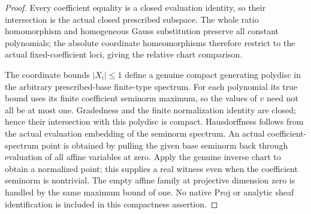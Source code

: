 \begin{proof}
Every coefficient equality is a closed evaluation identity, so their
intersection is the actual closed prescribed subspace. The whole ratio
homomorphism and homogeneous Gauss substitution preserve all constant
polynomials; the absolute coordinate homeomorphisms therefore restrict
to the actual fixed-coefficient loci, giving the relative chart comparison.

The coordinate bounds $|X_i|\le1$ define a genuine compact generating
polydisc in the arbitrary prescribed-base finite-type spectrum. For each
polynomial its true bound uses its finite coefficient seminorm maximum,
so the values of $v$ need not all be at most one. Gradedness and the finite
normalization identity are closed; hence their intersection with this
polydisc is compact. Hausdorffness follows from the actual evaluation
embedding of the seminorm spectrum. An actual coefficient-spectrum point is obtained by pulling the given
base seminorm back through evaluation of all affine variables at zero.
Apply the genuine inverse chart to obtain a normalized point; this supplies
a real witness even when the coefficient seminorm is nontrivial. The empty
affine family at projective dimension zero is handled by the same maximum
bound of one. No native Proj or analytic sheaf identification is included
in this compactness assertion.
\end{proof}
